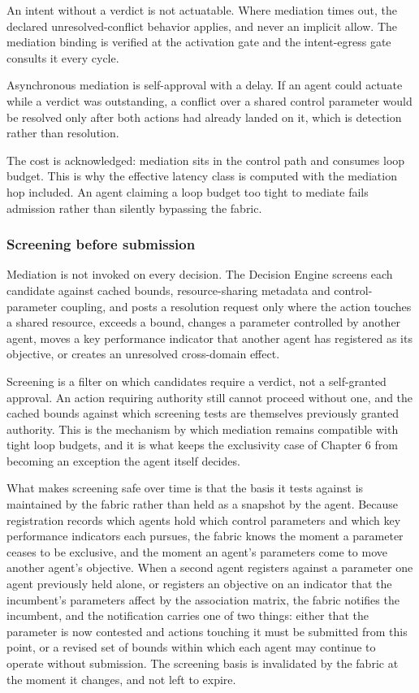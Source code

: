An intent without a verdict is not actuatable. Where mediation times
out, the declared unresolved-conflict behavior applies, and never an
implicit allow. The mediation binding is verified at the activation gate
and the intent-egress gate consults it every cycle.

Asynchronous mediation is self-approval with a delay. If an agent could
actuate while a verdict was outstanding, a conflict over a shared
control parameter would be resolved only after both actions had already
landed on it, which is detection rather than resolution.

The cost is acknowledged: mediation sits in the control path and
consumes loop budget. This is why the effective latency class is
computed with the mediation hop included. An agent claiming a loop
budget too tight to mediate fails admission rather than silently
bypassing the fabric.

\hypertarget{screening-before-submission}{%
\subsubsection{Screening before submission}\label{screening-before-submission}}

Mediation is not invoked on every decision. The Decision Engine screens
each candidate against cached bounds, resource-sharing metadata and
control-parameter coupling, and posts a resolution request only where
the action touches a shared resource, exceeds a bound, changes a
parameter controlled by another agent, moves a key performance indicator
that another agent has registered as its objective, or creates an
unresolved cross-domain effect.

Screening is a filter on which candidates require a verdict, not a
self-granted approval. An action requiring authority still cannot
proceed without one, and the cached bounds against which screening tests
are themselves previously granted authority. This is the mechanism by
which mediation remains compatible with tight loop budgets, and it is
what keeps the exclusivity case of Chapter 6 from becoming an exception
the agent itself decides.

What makes screening safe over time is that the basis it tests against
is maintained by the fabric rather than held as a snapshot by the agent.
Because registration records which agents hold which control parameters
and which key performance indicators each pursues, the fabric knows the
moment a parameter ceases to be exclusive, and the moment an agent's
parameters come to move another agent's objective. When a second agent
registers against a parameter one agent previously held alone, or
registers an objective on an indicator that the incumbent's parameters
affect by the association matrix, the fabric notifies the incumbent, and
the notification carries one of two things: either that the parameter is
now contested and actions touching it must be submitted from this point,
or a revised set of bounds within which each agent may continue to
operate without submission. The screening basis is invalidated by the
fabric at the moment it changes, and not left to expire.


